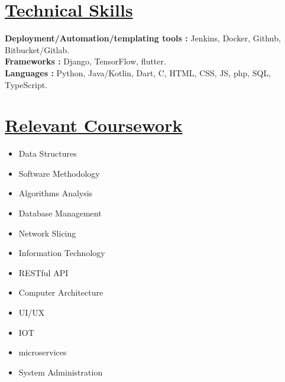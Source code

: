 \documentclass[letterpaper,11pt]{article}
\newcommand{\resumeSubHeadingListStart}{\begin{itemize}[leftmargin=0.0in, label={}]}
\newcommand{\resumeSubHeadingListEnd}{\end{itemize}}
\begin{document}
\section{\href{https://www.linkedin.com/in/yakkshit/details/skills/}{Technical Skills} \faLink}
 \begin{itemize}[leftmargin=0.15in, label={}]
    \small{\item{
     \textbf{Deployment/Automation/templating tools : }{Jenkins, Docker, Github, Bitbucket/Gitlab.} \\
     \textbf{Frameworks : }{Django, TensorFlow, flutter.}\\
     \textbf{Languages : }{ Python, Java/Kotlin, Dart, C, HTML, CSS, JS, php, SQL, TypeScript.}\\
    }}
 \end{itemize}
 \vspace{-17pt}

 
\section{\href{https://www.linkedin.com/in/yakkshit/details/courses/}{Relevant Coursework} \faLink}
        \begin{multicols}{4}
            \begin{itemize}[itemsep=-4pt, parsep=3pt]
                \item\small Data Structures
                \item Software Methodology
                \item Algorithms Analysis
                \item Database Management
                \item Network Slicing
                \item Information Technology
                \item RESTful API
                \item Computer Architecture \\
                \item UI/UX
                \item IOT
                \item microservices
                \item System Administration\\
            \end{itemize}
        \end{multicols}
        \vspace*{2.0\multicolsep}
\end{document}
